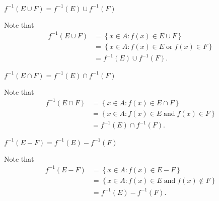 \documentclass[12pt]{article}
\newenvironment{problem}[2][Problem]{\begin{trivlist} \item[\hskip \labelsep {\bfseries #1}\hskip \labelsep {\bfseries #2.}]}{\end{trivlist}}
\newenvironment{solution}[2][Solution]{\begin{trivlist} \item[\hskip \labelsep {\bfseries #1}\hskip \labelsep {\bfseries #2.}]}{\end{trivlist}}
\begin{document}
\begin{problem}{12}
\begin{enumerate}[label=(\alph*)]
\begin{solution}{(c)}
    \end{solution}
	\item $f^{-1}(E\cup F) = f^{-1}(E)\cup f^{-1}(F)$
	  \begin{solution}{(d)}
	    Note that
    \begin{align*}
      f^{-1}(E\cup F) &= \left\{x\in A: f(x)\in E\cup F\right\}\\
      &= \left\{x\in A: f(x)\in E \; \mathrm{or}\; f(x)\in F\right\}\\
      &= f^{-1}(E)\cup f^{-1}(F).
    \end{align*}
    \end{solution}
	\item $f^{-1}(E\cap F) = f^{-1}(E)\cap f^{-1}(F)$
	  \begin{solution}{(d)}
	    Note that
    \begin{align*}
      f^{-1}(E\cap F) &= \left\{x\in A: f(x)\in E\cap F\right\}\\
      &= \left\{x\in A: f(x)\in E\; \mathrm{and}\; f(x)\in F \right\}\\
      &= f^{-1}(E)\cap f^{-1}(F).
    \end{align*}
    \end{solution}
	\item $f^{-1}(E- F) = f^{-1}(E)- f^{-1}(F)$
	  \begin{solution}{(d)}
	    Note that
    \begin{align*}
      f^{-1}(E-F) &= \left\{x\in A:f(x)\in E-F\right\}\\
      &= \left\{x\in A: f(x)\in E \; \mathrm{and} \; f(x)\not\in F\right\}\\
      &= f^{-1}(E)-f^{-1}(F).
    \end{align*}
    \end{solution}
	
    \end{enumerate}
    \end{problem}
 
\end{document}
